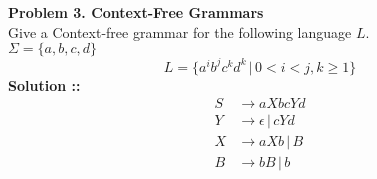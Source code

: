 \documentclass[11pt]{article}
\begin{document}

\textbf{Problem 3. Context-Free Grammars} \\
Give a Context-free grammar for the following language $L$. \\
$\Sigma = \{a,b,c,d\}$
$$L = \{a^ib^jc^kd^k \,|\, 0 < i < j, k\ge 1\}$$
\vspace{5px}\textbf{Solution ::}
\begin{align}
    S&\longrightarrow aXbcYd \\
    Y&\longrightarrow\epsilon\,|\, cYd \\
    X&\longrightarrow aXb\,|\, B \\
    B&\longrightarrow bB\,|\, b
\end{align}
\pagebreak

\end{document}

